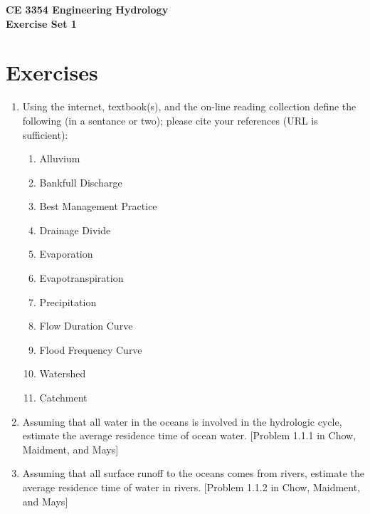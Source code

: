 \documentclass[12pt]{article}
\begin{document}
\begin{center}
{\textbf{{ CE 3354 Engineering Hydrology} \\ {Exercise Set 1}}}
\end{center}

\section*{\small{Exercises}}
\begin{enumerate}\item Using the internet, textbook(s), and the on-line reading collection define the following (in a sentance or two); please cite your references (URL is sufficient): 
 \begin{enumerate}
 \item Alluvium 
 \item Bankfull Discharge
 \item Best Management Practice
 \item Drainage Divide 
 \item Evaporation 
 \item Evapotranspiration 
 \item Precipitation 
 \item Flow Duration Curve
 \item Flood Frequency Curve
 \item Watershed 
 \item Catchment
 \end{enumerate}


\item Assuming that all water in the oceans is involved in the hydrologic cycle, estimate the average residence time of ocean water. [Problem 1.1.1 in Chow, Maidment, and Mays]

\item Assuming that all surface runoff to the oceans comes from rivers, estimate the average residence time of water in rivers. [Problem 1.1.2 in Chow, Maidment, and Mays]


\end{enumerate}
\end{document}
